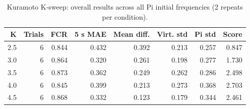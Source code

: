 \begin{table}[htbp]
\centering
\footnotesize
\caption{Kuramoto K-sweep: overall results across all Pi initial frequencies (2 repeats per condition).}
\label{tab:k_sweep_overall}
\begin{tabular}{@{}rrrrrrrr@{}}
\toprule
\textbf{K} & \textbf{Trials} & \textbf{FCR} & \textbf{5 s MAE} & \textbf{Mean diff.} & \textbf{Virt. std} & \textbf{Pi std} & \textbf{Score} \\
\midrule
2.5 & 6 & 0.844 & 0.432 & 0.392 & 0.213 & 0.257 & 0.847 \\
3.0 & 6 & 0.864 & 0.320 & 0.261 & 0.198 & 0.277 & 1.730 \\
3.5 & 6 & 0.873 & 0.362 & 0.249 & 0.262 & 0.286 & 2.498 \\
4.0 & 6 & 0.845 & 0.399 & 0.213 & 0.273 & 0.368 & 2.703 \\
4.5 & 6 & 0.868 & 0.332 & 0.123 & 0.179 & 0.344 & 2.461 \\
\bottomrule
\end{tabular}
\end{table}
